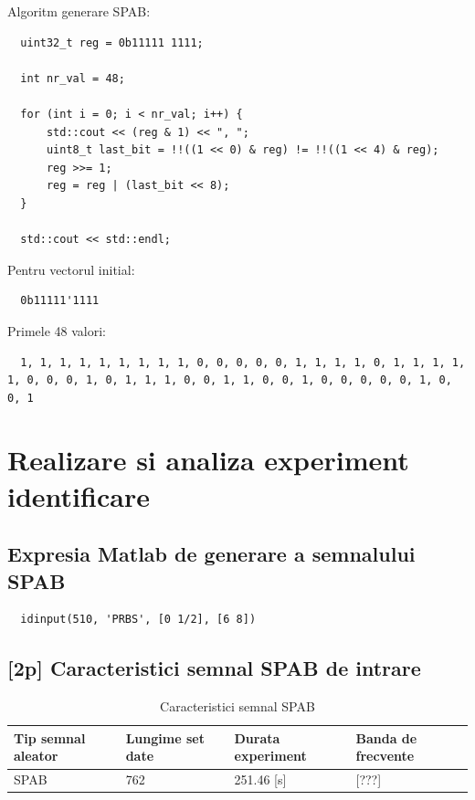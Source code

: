 \documentclass[12pt,english]{article}
\begin{document}
Algoritm generare SPAB:
\begin{lstlisting}
  uint32_t reg = 0b11111 1111; 

  int nr_val = 48; 

  for (int i = 0; i < nr_val; i++) { 
      std::cout << (reg & 1) << ", "; 
      uint8_t last_bit = !!((1 << 0) & reg) != !!((1 << 4) & reg); 
      reg >>= 1; 
      reg = reg | (last_bit << 8); 
  } 

  std::cout << std::endl;
\end{lstlisting}

Pentru vectorul initial:
\begin{lstlisting}
  0b11111'1111
\end{lstlisting}

Primele 48 valori:
\begin{lstlisting}
  1, 1, 1, 1, 1, 1, 1, 1, 1, 0, 0, 0, 0, 0, 1, 1, 1, 1, 0, 1, 1, 1, 1, 1, 0, 0, 0, 1, 0, 1, 1, 1, 0, 0, 1, 1, 0, 0, 1, 0, 0, 0, 0, 0, 1, 0, 0, 1
\end{lstlisting}

\section { Realizare si analiza experiment identificare }
\subsection { Expresia Matlab de generare a semnalului SPAB }
\begin{lstlisting}
  idinput(510, 'PRBS', [0 1/2], [6 8])
\end{lstlisting}

\subsection { [2p] Caracteristici semnal SPAB de intrare }
\begin{table}[H]
  \centering
    \begin{tabular}{|l|l|l|l|}
      \hline
      Tip semnal aleator & Lungime set date & Durata experiment & Banda de frecvente \\
      \hline
      SPAB & 762 & 251.46 [s] & [???] \\
      \hline
    \end{tabular}
    \caption{Caracteristici semnal SPAB}
\end{table}
\end{document}
